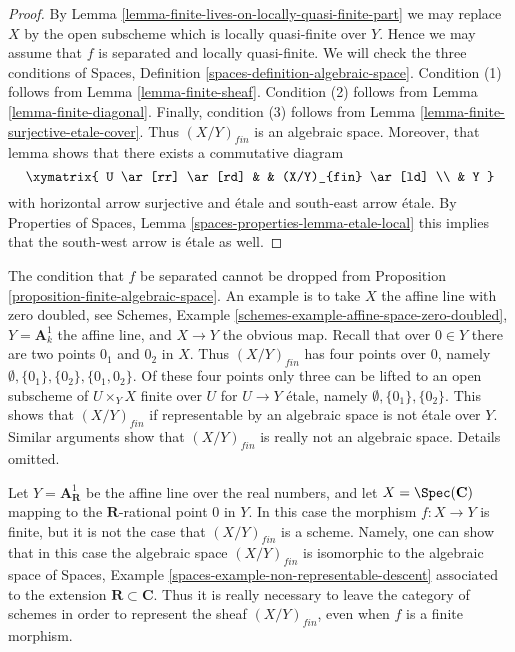\begin{proof}
By
Lemma \ref{lemma-finite-lives-on-locally-quasi-finite-part}
we may replace $X$ by the open subscheme which is locally quasi-finite
over $Y$. Hence we may assume that $f$ is separated and locally quasi-finite.
We will check the three conditions of
Spaces, Definition \ref{spaces-definition-algebraic-space}.
Condition (1) follows from
Lemma \ref{lemma-finite-sheaf}.
Condition (2) follows from
Lemma \ref{lemma-finite-diagonal}.
Finally, condition (3) follows from
Lemma \ref{lemma-finite-surjective-etale-cover}.
Thus $(X/Y)_{fin}$ is an algebraic space.
Moreover, that lemma shows that there exists a commutative
diagram
$$
\xymatrix{
U \ar[rr] \ar[rd] & & (X/Y)_{fin} \ar[ld] \\
& Y
}
$$
with horizontal arrow surjective and \'etale and south-east arrow
\'etale. By
Properties of Spaces, Lemma \ref{spaces-properties-lemma-etale-local}
this implies that the south-west arrow is \'etale as well.
\end{proof}

\begin{remark}
\label{remark-warning}
The condition that $f$ be separated cannot be dropped from
Proposition \ref{proposition-finite-algebraic-space}.
An example is to take $X$ the affine line with zero doubled, see
Schemes, Example \ref{schemes-example-affine-space-zero-doubled},
$Y = \mathbf{A}^1_k$ the affine line, and $X \to Y$ the obvious map.
Recall that over $0 \in Y$ there are two points $0_1$ and $0_2$
in $X$. Thus $(X/Y)_{fin}$ has four points over $0$, namely
$\emptyset, \{0_1\}, \{0_2\}, \{0_1, 0_2\}$.
Of these four points only three can be lifted to an open
subscheme of $U \times_Y X$ finite over $U$ for $U \to Y$ \'etale,
namely $\emptyset, \{0_1\}, \{0_2\}$. This shows that $(X/Y)_{fin}$
if representable by an algebraic space is not \'etale over $Y$.
Similar arguments show that $(X/Y)_{fin}$ is really not an algebraic
space. Details omitted.
\end{remark}

\begin{remark}
\label{remark-not-scheme}
Let $Y = \mathbf{A}^1_{\mathbf{R}}$ be the affine line over the real
numbers, and let $X = \Spec(\mathbf{C})$ mapping to the
$\mathbf{R}$-rational point $0$ in $Y$. In this case the morphism
$f : X \to Y$ is finite, but it is not the case that $(X/Y)_{fin}$
is a scheme. Namely, one can show that in this case the algebraic
space $(X/Y)_{fin}$ is isomorphic to the algebraic space of
Spaces, Example \ref{spaces-example-non-representable-descent}
associated to the extension $\mathbf{R} \subset \mathbf{C}$.
Thus it is really necessary to leave the category of schemes
in order to represent the sheaf $(X/Y)_{fin}$, even when $f$
is a finite morphism.
\end{remark}

